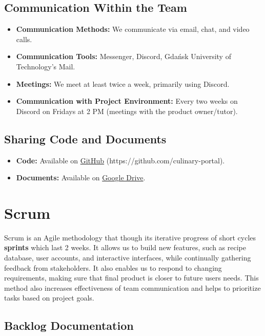 \subsection{Communication Within the Team}
\begin{itemize}
    \item \textbf{Communication Methods:} We communicate via email, chat, and video calls.
    \item \textbf{Communication Tools:} Messenger, Discord, Gdańsk University of Technology's Mail.
    \item \textbf{Meetings:} We meet at least twice a week, primarily using Discord.
    \item \textbf{Communication with Project Environment:} Every two weeks on Discord on Fridays at 2 PM (meetings with the product owner/tutor).
\end{itemize}

\subsection{Sharing Code and Documents}
\begin{itemize}
    \item \textbf{Code:} Available on \href{https://github.com/culinary-portal}{GitHub} (https://github.com/culinary-portal).
    \item \textbf{Documents:} Available on \href{https://drive.google.com/drive/folders/1RUclEIFVWzzO89Ef-BEOq56EYikbE4ET?usp=drive_link}{Google Drive}.
\end{itemize}

\section{Scrum}

 Scrum is an Agile methodology that though its iterative progress of  short cycles \textbf{sprints} which last 2 weeks. It allows us to build new features, such as recipe database, user accounts, and interactive interfaces, while continually gathering feedback from stakeholders. It also enables us to respond to changing requirements, making sure that final product is closer to future users needs. This method also increases effectiveness of team communication and helps to prioritize tasks based on project goals. 
 
 \subsection{Backlog Documentation}

